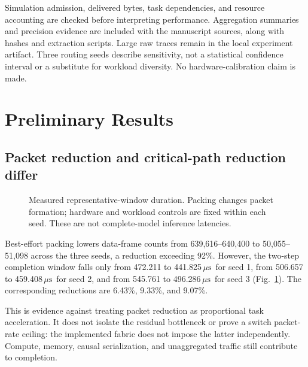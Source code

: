 \documentclass[conference]{IEEEtran}
\newcommand{\us}{\ensuremath{\mu\mathrm{s}}}
\begin{document}
Simulation admission, delivered bytes, task dependencies, and resource accounting are checked before interpreting performance. Aggregation summaries and precision evidence are included with the manuscript sources, along with hashes and extraction scripts. Large raw traces remain in the local experiment artifact. Three routing seeds describe sensitivity, not a statistical confidence interval or a substitute for workload diversity. No hardware-calibration claim is made.

\section{Preliminary Results}
\subsection{Packet reduction and critical-path reduction differ}
\begin{figure}[t]
\centering
{}
\caption{Measured representative-window duration. Packing changes packet formation; hardware and workload controls are fixed within each seed. These are not complete-model inference latencies.}
\label{fig:packing}
\end{figure}

Best-effort packing lowers data-frame counts from 639,616--640,400 to 50,055--51,098 across the three seeds, a reduction exceeding 92\%. However, the two-step completion window falls only from 472.211 to 441.825\,\us\ for seed 1, from 506.657 to 459.408\,\us\ for seed 2, and from 545.761 to 496.286\,\us\ for seed 3 (Fig.~\ref{fig:packing}). The corresponding reductions are 6.43\%, 9.33\%, and 9.07\%.

This is evidence against treating packet reduction as proportional task acceleration. It does not isolate the residual bottleneck or prove a switch packet-rate ceiling: the implemented fabric does not impose the latter independently. Compute, memory, causal serialization, and unaggregated traffic still contribute to completion.
\end{document}
